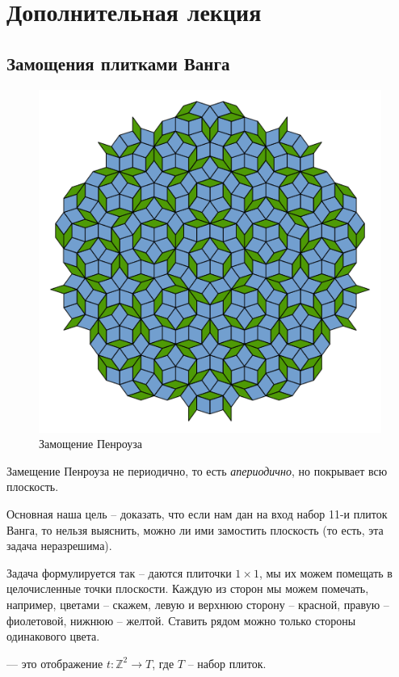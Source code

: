 \chapter{Дополнительная лекция}
\section{Замощения плитками Ванга}

\begin{figure}[ht]
    \centering
	\includegraphics[scale=0.75]{./imgs/Penrose_Tiling.png}
	\caption{Замощение Пенроуза}
\end{figure}
Замещение Пенроуза не периодично, то есть \textit{апериодично}, но покрывает всю плоскость.

Основная наша цель -- доказать, что если нам дан на вход набор 11-и плиток Ванга, то
нельзя выяснить, можно ли ими замостить плоскость (то есть, эта задача неразрешима).

Задача формулируется так -- даются плиточки $ 1 \times 1 $, мы их можем помещать в целочисленные точки плоскости. Каждую из сторон мы можем помечать, например, цветами -- скажем, левую и верхнюю сторону -- красной, правую -- фиолетовой, нижнюю -- желтой. Ставить рядом можно только стороны одинакового цвета.


\begin{defn}[Замощение]
     --- это отображение $ t\colon  \mathbb{Z}^2 \to T $, где $ T $ -- набор плиток.
\end{defn}

